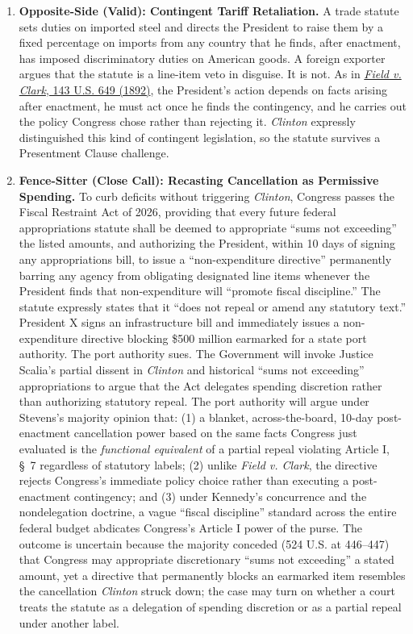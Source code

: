 \documentclass[12pt]{article}
\begin{document}
\begin{enumerate}
\item \textbf{Opposite-Side (Valid): Contingent Tariff Retaliation.} A trade statute sets duties on imported steel and directs the President to raise them by a fixed percentage on imports from any country that he finds, after enactment, has imposed discriminatory duties on American goods. A foreign exporter argues that the statute is a line-item veto in disguise. It is not. As in \href{https://supreme.justia.com/cases/federal/us/143/649/}{\textit{Field v. Clark}, 143 U.S. 649 (1892)}, the President's action depends on facts arising after enactment, he must act once he finds the contingency, and he carries out the policy Congress chose rather than rejecting it. \textit{Clinton} expressly distinguished this kind of contingent legislation, so the statute survives a Presentment Clause challenge.

\item \textbf{Fence-Sitter (Close Call): Recasting Cancellation as Permissive Spending.} To curb deficits without triggering \textit{Clinton}, Congress passes the Fiscal Restraint Act of 2026, providing that every future federal appropriations statute shall be deemed to appropriate ``sums not exceeding'' the listed amounts, and authorizing the President, within 10 days of signing any appropriations bill, to issue a ``non-expenditure directive'' permanently barring any agency from obligating designated line items whenever the President finds that non-expenditure will ``promote fiscal discipline.'' The statute expressly states that it ``does not repeal or amend any statutory text.'' President X signs an infrastructure bill and immediately issues a non-expenditure directive blocking \$500 million earmarked for a state port authority. The port authority sues. The Government will invoke Justice Scalia's partial dissent in \textit{Clinton} and historical ``sums not exceeding'' appropriations to argue that the Act delegates spending discretion rather than authorizing statutory repeal. The port authority will argue under Stevens's majority opinion that: (1) a blanket, across-the-board, 10-day post-enactment cancellation power based on the same facts Congress just evaluated is the \emph{functional equivalent} of a partial repeal violating Article I, \S~7 regardless of statutory labels; (2) unlike \textit{Field v. Clark}, the directive rejects Congress's immediate policy choice rather than executing a post-enactment contingency; and (3) under Kennedy's concurrence and the nondelegation doctrine, a vague ``fiscal discipline'' standard across the entire federal budget abdicates Congress's Article I power of the purse. The outcome is uncertain because the majority conceded (524 U.S. at 446--447) that Congress may appropriate discretionary ``sums not exceeding'' a stated amount, yet a directive that permanently blocks an earmarked item resembles the cancellation \textit{Clinton} struck down; the case may turn on whether a court treats the statute as a delegation of spending discretion or as a partial repeal under another label.

\end{enumerate}
\end{document}

